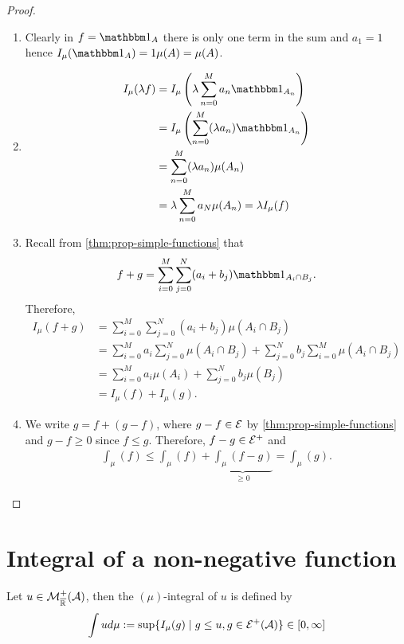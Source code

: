 \begin{proof}
	\begin{enumerate}
		\item Clearly in $f = \ind_A$ there is only one term in the sum and $a_1 = 1$ hence $I_\mu(\ind_A) = 1\mu(A) = \mu(A)$.
		\item
		\begin{align*}
			I_\mu(\lambda f)
			&= I_\mu\left( \lambda \sum_{n=0}^M a_n \ind_{A_n} \right)\\
			&= I_\mu\left( \sum_{n = 0}^M (\lambda a_n) \ind_{A_n} \right)\\
			&= \sum_{n = 0}^M (\lambda a_n)\mu(A_n)\\
			&= \lambda \sum_{n = 0}^M a_N \mu(A_n)
			= \lambda I_\mu(f)
		\end{align*}
		
		\item Recall from \autoref{thm:prop-simple-functions} that
		\begin{align*}
			f+g = \sum_{i=0}^{M}\sum_{j=0}^{N} (a_i + b_j)\ind_{A_i \cap B_j}.
		\end{align*}
		Therefore,
		\begin{align*}
			I_\mu(f+g)
			&= \sum_{i=0}^{M}\sum_{j=0}^{N} (a_i + b_j)\mu(A_i \cap B_j) \\
			&= \sum_{i=0}^M a_i \sum_{j=0}^N \mu(A_i \cap B_j) + \sum_{j=0}^N b_j \sum_{i=0}^M \mu(A_i \cap B_j)\\
			&= \sum_{i=0}^M a_i \mu(A_i) + \sum_{j=0}^N b_j \mu(B_j)\\
			&= I_\mu(f) + I_\mu(g). 
		\end{align*}
		
		\item We write $g = f + (g - f)$, where $g-f \in \mathcal{E}$ by \autoref{thm:prop-simple-functions} and $g -f \geq 0$ since $f \leq g$. Therefore, $f - g \in \mathcal{E}^+$ and
		\begin{align*}
			\int_\mu(f) \leq \int_\mu(f) + \underbrace{\int_\mu(f-g)}_{\geq 0} = \int_\mu(g).
		\end{align*}
	\end{enumerate}
\end{proof}

\section{Integral of a non-negative function}

\begin{dfn}
	\label{dfn:mu-integral}
	Let $u \in \mathcal{M}^+_{\overline{\mathbb{R}}}(\mathcal{A})$, then the $(\mu)$-integral of $u$ is defined by
	\begin{align}
		\int u d\mu := \sup \{ I_\mu(g) \mid g \leq u, g \in \mathcal{E}^+(\mathcal{A})\} \in [0, \infty]
	\end{align}
\end{dfn}

